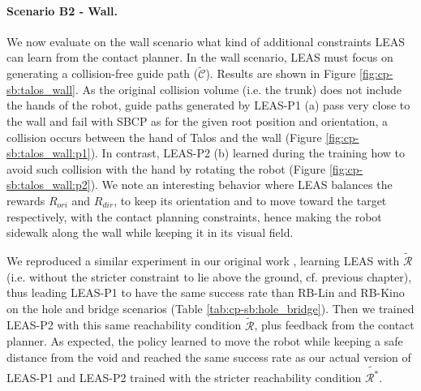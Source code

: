 
\paragraph{Scenario B2 - Wall.}

We now evaluate on the wall scenario what kind of additional constraints LEAS can learn from the contact planner. In the wall scenario, LEAS must focus on generating a collision-free guide path ($\tilde{\mathcal{C}}$).
Results are shown in Figure \ref{fig:cp-sb:talos_wall}.
As the original collision volume (i.e. the trunk) does not include the hands of the robot, guide paths generated by LEAS-P1 (a) pass very close to the wall and fail with SBCP as for the given root position and orientation, a collision occurs between the hand of Talos and the wall (Figure \ref{fig:cp-sb:talos_wall:p1}).
In contrast, LEAS-P2 (b) learned during the training how to avoid such collision with the hand by rotating the robot (Figure \ref{fig:cp-sb:talos_wall:p2}).
We note an interesting behavior where LEAS balances the rewards $R_{ori}$ and $R_{dir}$, to keep its orientation and to move toward the target respectively, with the contact planning constraints, hence making the robot sidewalk along the wall while keeping it in its visual field.

We reproduced a similar experiment in our original work \cite{LEAS}, learning LEAS with $\tilde{\mathcal{R}}$ (i.e. without the stricter constraint to lie above the ground, cf. previous chapter), thus leading LEAS-P1 to have the same success rate than RB-Lin and RB-Kino on the hole and bridge scenarios (Table \ref{tab:cp-sb:hole_bridge}).
Then we trained LEAS-P2 with this same reachability condition $\tilde{\mathcal{R}}$, plus feedback from the contact planner.
As expected, the policy learned to move the robot while keeping a safe distance from the void and reached the same success rate as our actual version of LEAS-P1 and LEAS-P2 trained with the stricter reachability condition $\tilde{\mathcal{R}^*}$.

